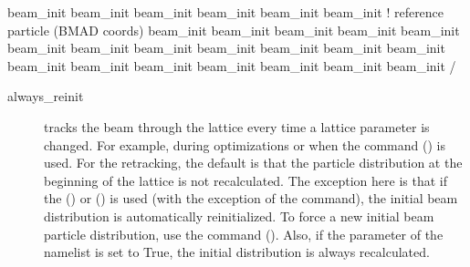 {{{{{{{{{{{\begin{example}
    beam_init%
    beam_init%
    beam_init%
    beam_init%
    beam_init%
    beam_init%
                                              !   reference particle (BMAD coords)
    beam_init%
    beam_init%
    beam_init%
    beam_init%
    beam_init%
    beam_init%
    beam_init%
    beam_init%
    beam_init%
    beam_init%
    beam_init%
    beam_init%
    beam_init%
    beam_init%
    beam_init%
    beam_init%
    beam_init%
    beam_init%
    beam_init%
  /
\end{example}

\begin{description}
%
\item[always_reinit] \Newline
\tao tracks the beam through the lattice every time a lattice parameter is changed. For example,
during optimizations or when the  command () is used. For the retracking, the
default is that the particle distribution at the beginning of the lattice is not recalculated. The
exception here is that if the  () or 
() is used (with the exception of the  command), the
initial beam distribution is automatically reinitialized. To force a new initial beam particle
distribution, use the  command (). Also, if the
 parameter of the  namelist is set to True, the initial
distribution is always recalculated.


\end{description}}}}}}}}}}}}
